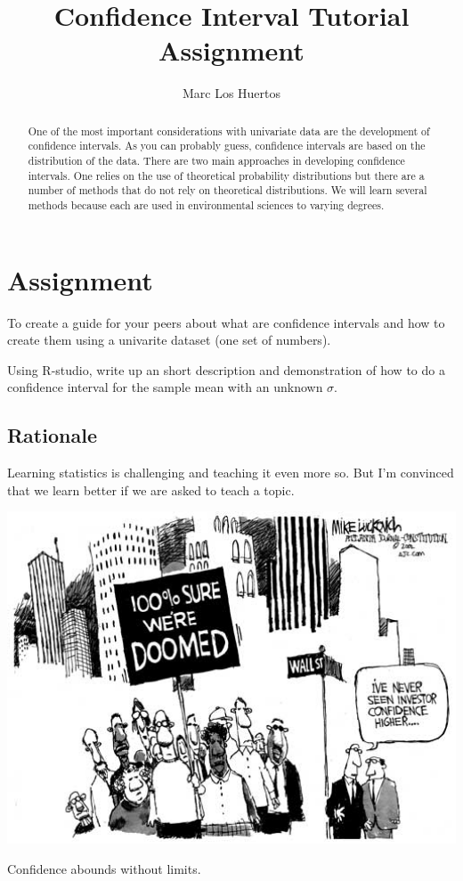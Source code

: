 \documentclass{tufte-handout}\usepackage[]{graphicx}\usepackage[]{color}
\title{Confidence Interval Tutorial Assignment %
}
\author[Marc Los Huertos]{Marc Los Huertos}
\begin{document}

\maketitle%
\begin{abstract}
\noindent One of the most important considerations with univariate data are the development of confidence intervals. As you can probably guess, confidence intervals are based on the distribution of the data. There are two main approaches in developing confidence intervals. One relies on the use of theoretical probability distributions but there are a number of methods that do not rely on theoretical distributions. We will learn several methods because each are used in environmental sciences to varying degrees.
\end{abstract}




\section{Assignment}

To create a guide for your peers about what are confidence intervals and how to create them using a univarite dataset (one set of numbers). 

Using R-studio, write up an short description and demonstration of how to do a confidence interval for the sample mean with an unknown $\sigma$. 

\subsection{Rationale}

Learning statistics is challenging and teaching it even more so. But I'm convinced that we learn better if we are asked to teach a topic. 

\begin{marginfigure}
	\centering
		\includegraphics[width=1.00\textwidth]{Investor_confidence500.jpg}
	\caption{Confidence abounds without limits.}
	\label{fig:Investor_confidence500}
\end{marginfigure}
\end{document}

